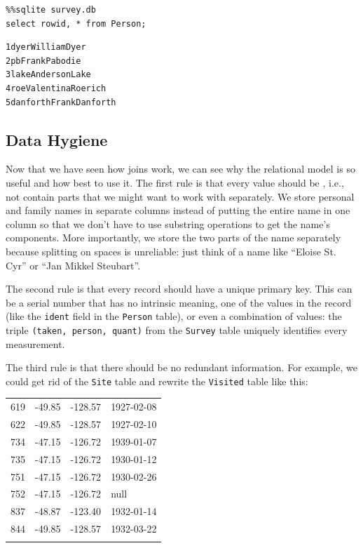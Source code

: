 \documentclass{book}
\begin{document}
\begin{verbatim}
%%sqlite survey.db
select rowid, * from Person;
\end{verbatim}

\begin{verbatim}
1dyerWilliamDyer
2pbFrankPabodie
3lakeAndersonLake
4roeValentinaRoerich
5danforthFrankDanforth
\end{verbatim}

\subsection{Data Hygiene}

Now that we have seen how joins work, we can see why the relational
model is so useful and how best to use it. The first rule is that every
value should be , i.e., not contain
parts that we might want to work with separately. We store personal and
family names in separate columns instead of putting the entire name in
one column so that we don't have to use substring operations to get the
name's components. More importantly, we store the two parts of the name
separately because splitting on spaces is unreliable: just think of a
name like ``Eloise St. Cyr'' or ``Jan Mikkel Steubart''.

The second rule is that every record should have a unique primary key.
This can be a serial number that has no intrinsic meaning, one of the
values in the record (like the \texttt{ident} field in the
\texttt{Person} table), or even a combination of values: the triple
\texttt{(taken, person, quant)} from the \texttt{Survey} table uniquely
identifies every measurement.

The third rule is that there should be no redundant information. For
example, we could get rid of the \texttt{Site} table and rewrite the
\texttt{Visited} table like this:

\begin{tabular}{@{}llll@{}}
\hline\noalign{\medskip}
619 & -49.85 & -128.57 & 1927-02-08
\\\noalign{\medskip}
622 & -49.85 & -128.57 & 1927-02-10
\\\noalign{\medskip}
734 & -47.15 & -126.72 & 1939-01-07
\\\noalign{\medskip}
735 & -47.15 & -126.72 & 1930-01-12
\\\noalign{\medskip}
751 & -47.15 & -126.72 & 1930-02-26
\\\noalign{\medskip}
752 & -47.15 & -126.72 & null
\\\noalign{\medskip}
837 & -48.87 & -123.40 & 1932-01-14
\\\noalign{\medskip}
844 & -49.85 & -128.57 & 1932-03-22
\\\noalign{\medskip}
\hline
\end{tabular}
\end{document}
